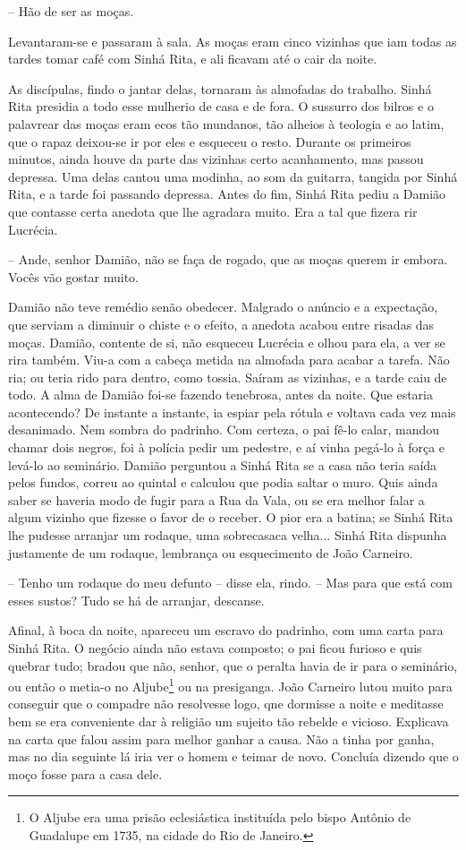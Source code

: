 -- Hão de ser as moças.

Levantaram-se e passaram à sala. As moças eram cinco vizinhas que iam
todas as tardes tomar café com Sinhá Rita, e ali ficavam até o cair da
noite.

As discípulas, findo o jantar delas, tornaram às almofadas do trabalho.
Sinhá Rita presidia a todo esse mulherio de casa e de fora. O sussurro
dos bilros e o palavrear das moças eram ecos tão mundanos, tão alheios à
teologia e ao latim, que o rapaz deixou-se ir por eles e esqueceu o
resto. Durante os primeiros minutos, ainda houve da parte das vizinhas
certo acanhamento, mas passou depressa. Uma delas cantou uma modinha, ao
som da guitarra, tangida por Sinhá Rita, e a tarde foi passando
depressa. Antes do fim, Sinhá Rita pediu a Damião que contasse certa
anedota que lhe agradara muito. Era a tal que fizera rir Lucrécia.

-- Ande, senhor Damião, não se faça de rogado, que as moças querem ir
embora. Vocês vão gostar muito.

Damião não teve remédio senão obedecer. Malgrado o anúncio e a
expectação, que serviam a diminuir o chiste e o efeito, a anedota acabou
entre risadas das moças. Damião, contente de si, não esqueceu Lucrécia e
olhou para ela, a ver se rira também. Viu-a com a cabeça metida na
almofada para acabar a tarefa. Não ria; ou teria rido para dentro, como
tossia. Saíram as vizinhas, e a tarde caiu de todo. A alma de Damião
foi-se fazendo tenebrosa, antes da noite. Que estaria acontecendo? De
instante a instante, ia espiar pela rótula e voltava cada vez mais
desanimado. Nem sombra do padrinho. Com certeza, o pai fê-lo calar,
mandou chamar dois negros, foi à polícia pedir um pedestre, e aí vinha
pegá-lo à força e levá-lo ao seminário. Damião perguntou a Sinhá Rita se
a casa não teria saída pelos fundos, correu ao quintal e calculou que
podia saltar o muro. Quis ainda saber se haveria modo de fugir para a
Rua da Vala, ou se era melhor falar a algum vizinho que fizesse o favor
de o receber. O pior era a batina; se Sinhá Rita lhe pudesse arranjar um
rodaque, uma sobrecasaca velha... Sinhá Rita dispunha justamente de um
rodaque, lembrança ou esquecimento de João Carneiro.

-- Tenho um rodaque do meu defunto -- disse ela, rindo. -- Mas para que
está com esses sustos? Tudo se há de arranjar, descanse.

Afinal, à boca da noite, apareceu um escravo do padrinho, com uma carta
para Sinhá Rita. O negócio ainda não estava composto; o pai ficou
furioso e quis quebrar tudo; bradou que não, senhor, que o peralta havia
de ir para o seminário, ou então o metia-o no Aljube\footnote{O Aljube
  era uma prisão eclesiástica instituída pelo bispo Antônio de Guadalupe
  em 1735, na cidade do Rio de Janeiro.} ou na presiganga. João Carneiro
lutou muito para conseguir que o compadre não resolvesse logo, qne
dormisse a noite e meditasse bem se era conveniente dar à religião um
sujeito tão rebelde e vicioso. Explicava na carta que falou assim para
melhor ganhar a causa. Não a tinha por ganha, mas no dia seguinte lá
iria ver o homem e teimar de novo. Concluía dizendo que o moço fosse
para a casa dele.

